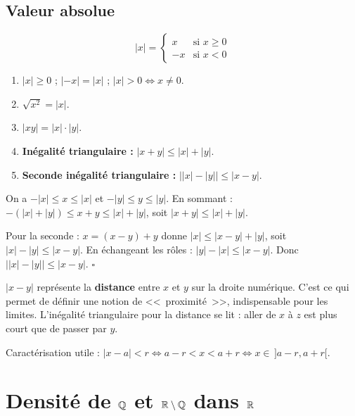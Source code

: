 \subsection{Valeur absolue}

\begin{defbox}
\[
  |x| = \begin{cases} x & \text{si } x \geqslant 0 \\ -x & \text{si } x < 0 \end{cases}
\]
\end{defbox}

\begin{propbox}
\begin{enumerate}[leftmargin=1cm]
  \item $|x| \geqslant 0$ ; $|-x| = |x|$ ; $|x| > 0 \iff x \neq 0$.
  \item $\sqrt{x^2} = |x|$.
  \item $|xy| = |x| \cdot |y|$.
  \item \textbf{Inégalité triangulaire :} $|x + y| \leqslant |x| + |y|$.
  \item \textbf{Seconde inégalité triangulaire :} $\bigl||x| - |y|\bigr| \leqslant |x - y|$.
\end{enumerate}
\end{propbox}

\begin{proofbox}
On a $-|x| \leqslant x \leqslant |x|$ et $-|y| \leqslant y \leqslant |y|$. En sommant : $-(|x|+|y|) \leqslant x+y \leqslant |x|+|y|$, soit $|x+y| \leqslant |x|+|y|$.

Pour la seconde : $x = (x-y) + y$ donne $|x| \leqslant |x-y| + |y|$, soit $|x| - |y| \leqslant |x-y|$. En échangeant les rôles : $|y| - |x| \leqslant |x-y|$. Donc $\bigl||x|-|y|\bigr| \leqslant |x-y|$. \hfill$\square$
\end{proofbox}

\begin{rembox}[Distance]
$|x - y|$ représente la \textbf{distance} entre $x$ et $y$ sur la droite numérique. C'est ce qui permet de définir une notion de <<~proximité~>>, indispensable pour les limites. L'inégalité triangulaire pour la distance se lit : aller de $x$ à $z$ est plus court que de passer par $y$.

Caractérisation utile : $|x - a| < r \iff a - r < x < a + r \iff x \in \,]a-r, a+r[$.
\end{rembox}


\section{Densité de $\mathbb{Q}$ et $\mathbb{R} \setminus \mathbb{Q}$ dans $\mathbb{R}$}

